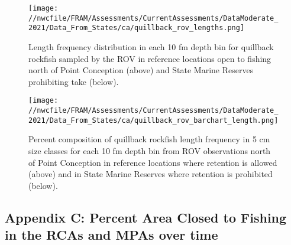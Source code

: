 \documentclass[11pt,
  english,
  a4paper,
]{article}
\begin{document}

\begin{figure}
\centering
\texttt{[image: //nwcfile/FRAM/Assessments/CurrentAssessments/DataModerate\_2021/Data\_From\_States/ca/quillback\_rov\_lengths.png]}
\caption{Length frequency distribution in each 10 fm depth bin for quillback rockfish sampled by the ROV in reference locations open to fishing north of Point Conception (above) and State Marine Reserves prohibiting take (below).\label{fig:ca-ROV}}
\end{figure}

\tagmcend\tagstructend


\begin{figure}
\centering
\texttt{[image: //nwcfile/FRAM/Assessments/CurrentAssessments/DataModerate\_2021/Data\_From\_States/ca/quillback\_rov\_barchart\_length.png]}
\caption{Percent composition of quillback rockfish length frequency in 5 cm size classes for each 10 fm depth bin from ROV observations north of Point Conception in reference locations where retention is allowed (above) and in State Marine Reserves where retention is prohibited (below).\label{fig:ca-ROV-percent}}
\end{figure}

\tagmcend\tagstructend

\clearpage


\hypertarget{append_c}{%
\subsection{Appendix C: Percent Area Closed to Fishing in the RCAs and MPAs over time}\label{append_c}}

\leavevmode\tagmcend\tagstructend

\end{document}
